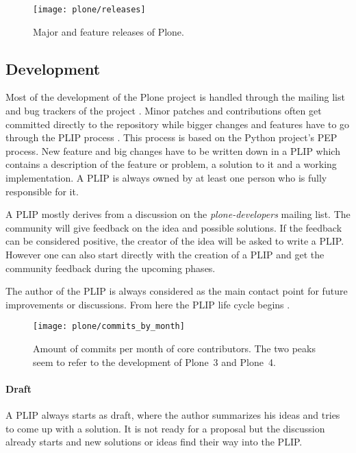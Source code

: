\begin{figure}[htbp]
  \centering
  \texttt{[image: plone/releases]}
  \caption[Major Releases of Plone]{Major and feature releases of Plone.}
\end{figure}


\subsection{Development} %

Most of the development of the Plone project is handled through the mailing
list and bug trackers of the project
\cite{PloneContribute,PloneCommunityProcesses}. Minor patches and contributions
often get committed directly to the repository while bigger changes and
features have to go through the \ac{PLIP} process
\cite{PlonePLIPProcess,PloneCommunityProcesses,PlonePLIPLifecycle}. This
process is based on the Python project's \acf*{PEP} process. New feature and
big changes have to be written down in a \ac{PLIP} which contains a description
of the feature or problem, a solution to it and a working implementation. A
\ac{PLIP} is always owned by at least one person who is fully responsible for
it.

A \ac{PLIP} mostly derives from a discussion on the \emph{plone-developers}
mailing list. The community will give feedback on the idea and possible
solutions. If the feedback can be considered positive, the creator of the idea
will be asked to write a \ac{PLIP}. However one can also start directly with
the creation of a \ac{PLIP} and get the community feedback during the upcoming
phases.

The author of the \ac{PLIP} is always considered as the main contact point for
future improvements or discussions. From here the \ac{PLIP} life cycle begins
\cite{PlonePLIPLifecycle}.

\begin{figure}[htbp]
  \centering
  \texttt{[image: plone/commits\_by\_month]}
  \caption[Commits by Month, Plone]
  {Amount of commits per month of core contributors. The two peaks seem to
    refer to the development of Plone~3 and Plone~4.}
\end{figure}

\paragraph{Draft}

A \ac{PLIP} always starts as draft, where the author summarizes his ideas and
tries to come up with a solution. It is not ready for a proposal but the
discussion already starts and new solutions or ideas find their way into the
\ac{PLIP}.

